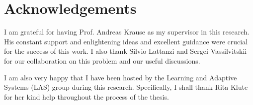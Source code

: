 \section{Acknowledgements}
I am grateful for having Prof. Andreas Krause as my supervisor in this research. His constant support and enlightening ideas and excellent guidance were crucial for the success of this work. I also thank Silvio Lattanzi and Sergei Vassilvitskii for our collaboration on this problem and our useful discussions. 

I am also very happy that I have been hosted by the Learning and Adaptive Systems (LAS) group during this research. Specifically, I shall thank Rita Klute for her kind help throughout the process of the thesis.
